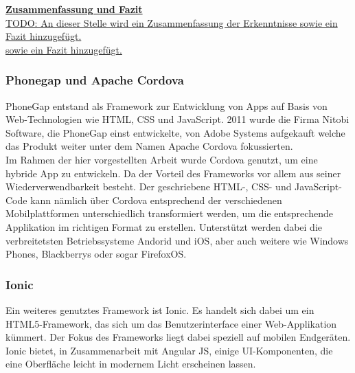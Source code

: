 \textbf{\underline{Zusammenfassung und Fazit}}\\





\underline{TODO: An dieser Stelle wird ein Zusammenfassung der Erkenntnisse sowie ein Fazit hinzugefügt. }\\
\underline{sowie ein Fazit hinzugefügt.}

\subsubsection{Phonegap und Apache Cordova}
PhoneGap entstand als Framework zur Entwicklung von Apps auf Basis von Web-Technologien wie HTML, CSS und JavaScript. 2011 wurde die Firma Nitobi Software, die PhoneGap einst entwickelte, von Adobe Systems aufgekauft welche das Produkt weiter unter dem Namen Apache Cordova fokussierten. 
\\
Im Rahmen der hier vorgestellten Arbeit wurde Cordova genutzt, um eine hybride App zu entwickeln. Da der Vorteil des Frameworks vor allem aus seiner Wiederverwendbarkeit besteht. Der geschriebene HTML-, CSS- und JavaScript-Code kann nämlich über Cordova entsprechend der verschiedenen Mobilplattformen unterschiedlich transformiert werden, um die entsprechende Applikation im richtigen Format zu erstellen. Unterstützt werden dabei die verbreitetsten Betriebssysteme Andorid und iOS, aber auch weitere wie Windows Phones, Blackberrys oder sogar FirefoxOS.

\subsubsection{Ionic}
Ein weiteres genutztes Framework ist Ionic. Es handelt sich dabei um ein HTML5-Framework, das sich um das Benutzerinterface einer Web-Applikation kümmert. Der Fokus des Frameworks liegt dabei speziell auf mobilen Endgeräten.
Ionic bietet, in Zusammenarbeit mit Angular JS, einige UI-Komponenten, die eine Oberfläche leicht in modernem Licht erscheinen lassen.

